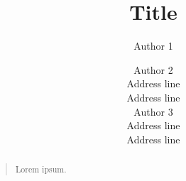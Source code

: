 \documentclass[letterpaper]{article}
\begin{document}
\title{Title}
\author{Author 1 \and Author 2\\
Address line\\
Address line\\
\And
Author 3\\
Address line\\
Address line}

\maketitle

\begin{abstract}
\begin{quote}
Lorem ipsum.
\end{quote}
\end{abstract}









\end{document}
